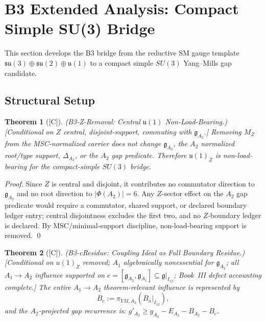 \documentclass[12pt,oneside]{amsbook}
\theoremstyle{plain}
\newtheorem{theorem}{Theorem}[section]
\theoremstyle{definition}
\theoremstyle{remark}
\newcommand{\status}[1]{\textup{[#1]}}
\begin{document}
\medskip


\section{B3 Extended Analysis: Compact Simple SU(3) Bridge}
\label{sec:B3-extended}

This section develops the B3 bridge from the reductive SM gauge template
$\mathfrak{su}(3)\oplus\mathfrak{su}(2)\oplus\mathfrak{u}(1)$ to a
compact simple $SU(3)$ Yang--Mills gap candidate.

\subsection{Structural Setup}

\begin{theorem}[\status{C}]\label{thm:B3-Z-removal}
\textup{(B3-Z-Removal: Central $\mathfrak{u}(1)$ Non-Load-Bearing.)}
\textup{[Conditional on $Z$ central, disjoint-support, commuting with
$\mathfrak{g}_{A_2}$.]}
Removing $M_Z$ from the MSC-normalized carrier does not change
$\mathfrak{g}_{A_2}$, the $A_2$ normalized root/type support,
$\Delta_{A_2}$, or the $A_2$ gap predicate. Therefore $\mathfrak{u}(1)_Z$
is non-load-bearing for the compact-simple $SU(3)$ bridge.
\end{theorem}

\begin{proof}
Since $Z$ is central and disjoint, it contributes no commutator direction
to $\mathfrak{g}_{A_2}$ and no root direction to $|\Phi(A_2)|=6$. Any
$Z$-sector effect on the $A_2$ gap predicate would require a commutator,
shared support, or declared boundary ledger entry; central disjointness
excludes the first two, and no $Z$-boundary ledger is declared. By
MSC/minimal-support discipline, non-load-bearing support is removed.
\qed
\end{proof}

\begin{theorem}[\status{C}]\label{thm:B3-c-residue}
\textup{(B3-cResidue: Coupling Ideal as Full Boundary Residue.)}
\textup{[Conditional on $u(1)_Z$ removed; $A_1$ algebraically
nonessential for $\mathfrak{g}_{A_2}$; all $A_1\to A_2$ influence
supported on $c = [\mathfrak{g}_{A_2}, \mathfrak{g}_{A_1}]
\subseteq \mathfrak{g}|_{I_{12}}$; Book~III defect accounting complete.]}
The entire $A_1\to A_2$ theorem-relevant influence is represented by
\[
 B_c := \pi_{YM,A_2}(B_n|_{I_{12}}),
\]
and the $A_2$-projected gap recurrence is:
$g'_{A_2} \ge g_{A_2} - E_{A_2} - B_{A_2} - B_c$.
\end{theorem}
\end{document}
